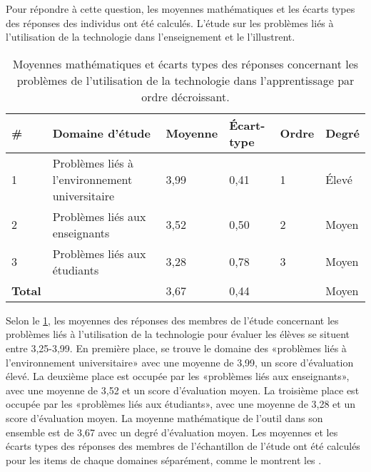 \documentclass[french]{textolivre}
\begin{document}
Pour répondre à cette question, les moyennes mathématiques et les écarts types des réponses des individus ont été calculés. L'étude sur les problèmes liés à l'utilisation de la technologie dans l'enseignement et le  l'illustrent.

\begin{table}[h!]
\centering
\begin{threeparttable}
\caption{Moyennes mathématiques et écarts types des réponses concernant les problèmes de l'utilisation de la technologie dans l'apprentissage par ordre décroissant.}
\label{tab3}
\begin{tabular}{lp{4cm}llll}
\toprule
\# & Domaine d’étude & Moyenne & Écart-type & Ordre & Degré \\
\midrule
1 & Problèmes liés à l'environnement universitaire & 3,99 & 0,41 & 1 & Élevé \\
2 & Problèmes liés aux enseignants & 3,52 & 0,50 & 2 & Moyen \\
3 & Problèmes liés aux étudiants & 3,28 & 0,78 & 3 & Moyen \\
\textbf{Total} & & 3,67 & 0,44 & & Moyen \\
\bottomrule
\end{tabular}
\end{threeparttable}
\end{table}

Selon le \cref{tab3}, les moyennes des réponses des membres de l'étude concernant les problèmes liés à l'utilisation de la technologie pour évaluer les élèves se situent entre 3,25-3,99. En première place, se trouve le domaine des «problèmes liés à l'environnement universitaire» avec une moyenne de 3,99, un score d'évaluation élevé. La deuxième place est occupée par les «problèmes liés aux enseignants», avec une moyenne de 3,52 et un score d'évaluation moyen. La troisième place est occupée par les «problèmes liés aux étudiants», avec une moyenne de 3,28 et un score d'évaluation moyen. La moyenne mathématique de l'outil dans son ensemble est de 3,67 avec un degré d'évaluation moyen. Les moyennes et les écarts types des réponses des membres de l'échantillon de l'étude ont été calculés pour les items de chaque domaines séparément, comme le montrent les .
\end{document}
